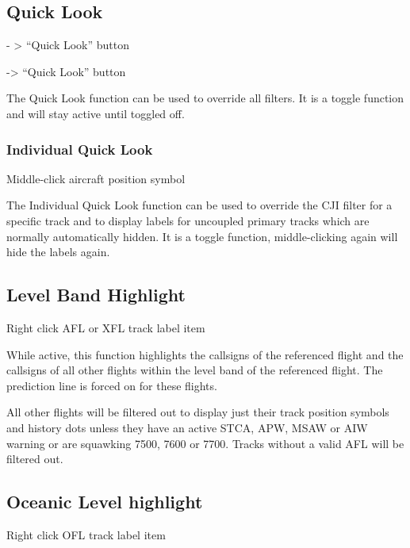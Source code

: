 \documentclass[a4paper,oneside,11pt]{memoir}
\begin{document}
\subsection{Quick Look}
\label{win:qlook}

 - > “Quick Look” button

 -> “Quick Look” button 


\bigskip

The Quick Look function can be used to override all filters. It is a toggle function and will stay active until toggled off.

\subsubsection{Individual Quick Look}

Middle-click aircraft position symbol

\bigskip

The Individual Quick Look function can be used to override the CJI filter for a specific track and to display labels for uncoupled primary tracks which are normally automatically hidden. It is a toggle function, middle-clicking again will hide the labels again.

\subsection{Level Band Highlight}\label{func:lbh}

Right click AFL or XFL track label item 

\bigskip

While active, this function highlights the callsigns of the referenced flight and the callsigns of all other flights within the level band of the referenced flight. The prediction line is forced on for these flights.

\bigskip

All other flights will be filtered out to display just their track position symbols and history dots unless they have an active STCA, APW, MSAW or AIW warning or are squawking 7500, 7600 or 7700. Tracks without a valid AFL will be filtered out.

\subsection{Oceanic Level highlight}\label{func:olh}

Right click OFL track label item 
\end{document}
